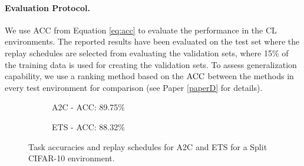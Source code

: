 \vspace{-3mm}
\paragraph{Evaluation Protocol.} We use ACC from Equation \ref{eq:acc} to evaluate the performance in the CL environments. The reported results have been evaluated on the test set where the replay schedules are selected from evaluating the validation sets, where 15\% of the training data is used for creating the validation sets. To assess generalization capability, we use a ranking method based on the ${\text{ACC}}$ between the methods in every test environment for comparison (see Paper \ref{paperD} for details).  


\vspace{-3mm}
\begin{figure}
	\setlength{\figwidth}{0.25\textwidth}
	\setlength{\figheight}{.14\textheight}
	\vspace{-3mm}
	\begin{subfigure}[b]{0.48\textwidth}
		\centering
		
		\vspace{-1mm}
		\caption{A2C - ACC: 89.75\%}
		\label{fig:policy_cifar10_a2c_chap4}
	\end{subfigure}
	\begin{subfigure}[b]{0.48\textwidth}
		\centering
		
		\caption{ETS - ACC: 88.32\%}
		\vspace{-2mm}
		\label{fig:policy_cifar10_ets_chap4}
	\end{subfigure}
	\captionsetup{width=.9\linewidth}
	\caption{Task accuracies and replay schedules for A2C and ETS for a Split CIFAR-10 environment.%
	}
	\vspace{-3mm}
	\label{fig:policy_cifar10_chap4}
\end{figure}
